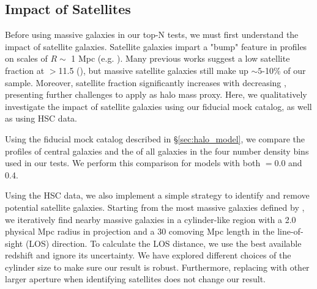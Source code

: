 \documentclass[a4paper,fleqn,usenatbib]{mnras}
\begin{document}
\subsection{Impact of Satellites}
    \label{sec:satellite}


    Before using massive galaxies in our top-N tests, we must first understand the impact of
    satellite galaxies. Satellite galaxies impart a "bump" feature in \dsigma{} profiles on
    scales of $R\sim$ 1 Mpc (e.g. \citealt{Mandelbaum2006a, Leauthaud2012}).
    Many previous works suggest a low satellite fraction at \logms{}$>$11.5 (\addref{}), but
    massive satellite galaxies still make up $\sim 5$-10\% of our sample. 
    Moreover, satellite fraction significantly increases with decreasing \mstar{}, presenting
    further challenges to apply \mstar{} as halo mass proxy. 
    Here, we qualitatively investigate the impact of satellite galaxies using our fiducial mock
    catalog, as well as using HSC data.
       
    Using the fiducial mock catalog described in \S \ref{sec:halo_model}, we compare the
    \dsigma{} profiles of central galaxies and the \dsigma{} of all galaxies in the four number
    density bins used in our \topn{} tests. We perform this comparison for models with both
    \sigmh{}$=0.0$ and 0.4.

    Using the HSC data, we also implement a simple strategy to identify and remove potential
    satellite galaxies.
    Starting from the most massive galaxies defined by \mmax{}, we iteratively find nearby
    massive galaxies in a cylinder-like region with a 2.0 physical Mpc radius in projection and a
    30 comoving Mpc length in the line-of-sight (LOS) direction.
    To calculate the LOS distance, we use the best available redshift and ignore its uncertainty.
    We have explored different choices of the cylinder size to make sure our result is robust.
    Furthermore, replacing \mmax{} with other larger aperture \mstar{} when identifying
    satellites does not change our result.
        

\end{document}
